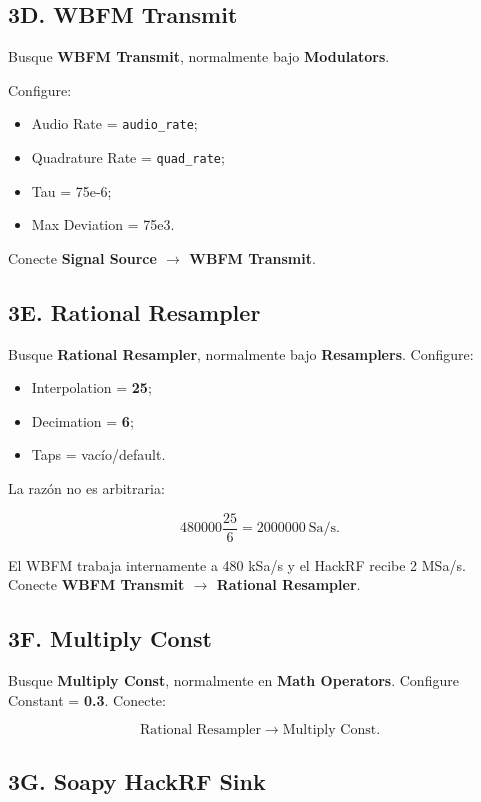 \subsection{3D. WBFM Transmit}

Busque \textbf{WBFM Transmit}, normalmente bajo \textbf{Modulators}.

Configure:

\begin{itemize}
    \item Audio Rate = \texttt{audio\_rate};
    \item Quadrature Rate = \texttt{quad\_rate};
    \item Tau = 75e-6;
    \item Max Deviation = 75e3.
\end{itemize}

Conecte \textbf{Signal Source $\rightarrow$ WBFM Transmit}.

\subsection{3E. Rational Resampler}

Busque \textbf{Rational Resampler}, normalmente bajo \textbf{Resamplers}. Configure:

\begin{itemize}
    \item Interpolation = \textbf{25};
    \item Decimation = \textbf{6};
    \item Taps = vacío/default.
\end{itemize}

La razón no es arbitraria:

\[
480000\frac{25}{6}=2000000~\text{Sa/s}.
\]

El WBFM trabaja internamente a 480 kSa/s y el HackRF recibe 2 MSa/s. Conecte \textbf{WBFM Transmit $\rightarrow$ Rational Resampler}.

\subsection{3F. Multiply Const}

Busque \textbf{Multiply Const}, normalmente en \textbf{Math Operators}. Configure Constant = \textbf{0.3}. Conecte:

\[
\text{Rational Resampler}\rightarrow\text{Multiply Const}.
\]

\subsection{3G. Soapy HackRF Sink}

